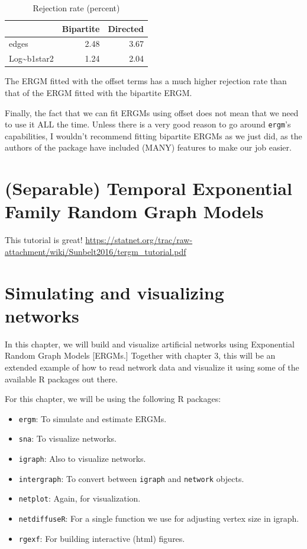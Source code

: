 \documentclass[
]{book}
\providecommand{\tightlist}{%
  \setlength{\itemsep}{0pt}\setlength{\parskip}{0pt}}
\begin{document}
\begin{table}

\caption{\label{tab:05-example2-post-dist}Rejection rate (percent)}
\centering
\begin{tabular}[t]{l|r|r}
\hline
  & Bipartite & Directed\\
\hline
edges & 2.48 & 3.67\\
\hline
Log\textasciitilde{}b1star2 & 1.24 & 2.04\\
\hline
\end{tabular}
\end{table}

The ERGM fitted with the offset terms has a much higher rejection rate
than that of the ERGM fitted with the bipartite ERGM.

Finally, the fact that we can fit ERGMs using offset does not mean that
we need to use it ALL the time. Unless there is a very good reason to
go around \texttt{ergm}'s capabilities, I wouldn't recommend fitting bipartite
ERGMs as we just did, as the authors of the package have included (MANY)
features to make our job easier.

\hypertarget{separable-temporal-exponential-family-random-graph-models}{%
\chapter{(Separable) Temporal Exponential Family Random Graph Models}\label{separable-temporal-exponential-family-random-graph-models}}

This tutorial is great! \url{https://statnet.org/trac/raw-attachment/wiki/Sunbelt2016/tergm_tutorial.pdf}

\hypertarget{simulating-and-visualizing-networks}{%
\chapter{Simulating and visualizing networks}\label{simulating-and-visualizing-networks}}

In this chapter, we will build and visualize artificial networks using Exponential
Random Graph Models {[}ERGMs.{]} Together with chapter 3, this will be an extended
example of how to read network data and visualize it using some of the available
R packages out there.

For this chapter, we will be using the following R packages:

\begin{itemize}
\tightlist
\item
  \texttt{ergm}: To simulate and estimate ERGMs.
\item
  \texttt{sna}: To visualize networks.
\item
  \texttt{igraph}: Also to visualize networks.
\item
  \texttt{intergraph}: To convert between \texttt{igraph} and \texttt{network} objects.
\item
  \texttt{netplot}: Again, for visualization.
\item
  \texttt{netdiffuseR}: For a single function we use for adjusting vertex size in igraph.
\item
  \texttt{rgexf}: For building interactive (html) figures.
\end{itemize}
\end{document}
